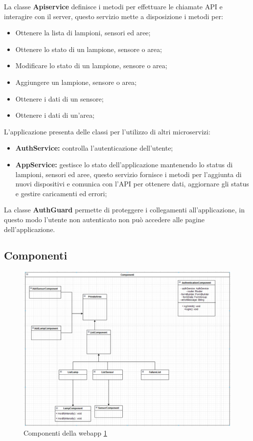 La classe \textbf{Apiservice} definisce i metodi per effettuare le chiamate API e interagire con il server, questo servizio mette a disposizione i metodi per:
\begin{itemize}
    \item Ottenere la lista di lampioni, sensori ed aree;
    \item Ottenere lo stato di un lampione, sensore o area;
    \item Modificare lo stato di un lampione, sensore o area;
    \item Aggiungere un lampione, sensore o area;
    \item Ottenere i dati di un sensore;
    \item Ottenere i dati di un'area;
\end{itemize}

L'applicazione presenta delle classi per l'utilizzo di altri microservizi:
\begin{itemize}
    \item \textbf{AuthService:} controlla l'autenticazione dell'utente;
    \item \textbf{AppService:} gestisce lo stato dell'applicazione mantenendo lo status di lampioni, sensori ed aree, questo servizio fornisce i metodi per l'aggiunta di nuovi dispositivi e comunica con l'API per ottenere dati, aggiornare gli status e gestire caricamenti ed errori;
\end{itemize}

La classe \textbf{AuthGuard} permette di proteggere i collegamenti all'applicazione, in questo modo l'utente non autenticato non può accedere alle pagine dell'applicazione.

\subsection{Componenti}

\begin{figure}[h]
    \centering
    \includegraphics[width=\textwidth]{img/components_webapp.png}
    \caption{Componenti della webapp \ref{fig:components_webapp}}
    \label{fig:components_webapp}
\end{figure}

